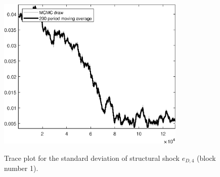 \begin{figure}[H]
\centering
  \includegraphics[width=0.8\textwidth]{BRS_sectoral_wo_fixed_cost/graphs/TracePlot_SE_e_D_news_blck_1}\\
    \caption{Trace plot for the standard deviation of structural shock ${e_{D,4}}$ (block number 1).}
\end{figure}

